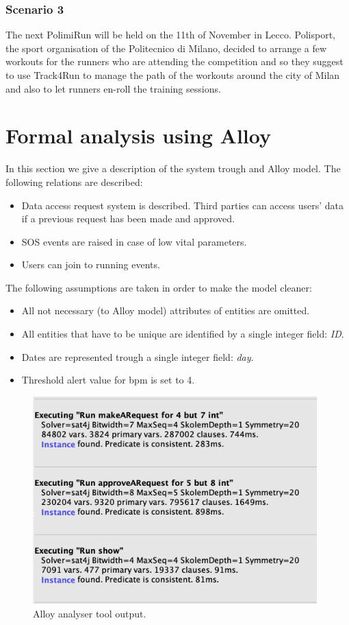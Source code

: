 \documentclass{article}
\begin{document}
	\subsubsection{Scenario 3}
	The next PolimiRun will be held on the 11th of November in Lecco.
	Polisport, the sport organisation of the Politecnico di Milano, 
	decided to arrange a few workouts for the runners who are 
	attending the competition and so they suggest to use Track4Run to
	manage the path of the workouts around the city of Milan and also
	to let runners en-roll the training sessions. 

\newpage
\section{Formal analysis using Alloy}

In this section we give a description of the system trough and Alloy model.
The following relations are described:
\begin{itemize}
	\item Data access request system is described. Third parties can access users' data
		if a previous request has been made and approved.
	\item SOS events are raised in case of low vital parameters.
	\item Users can join to running events.
\end{itemize}
The following assumptions are taken in order to make the model cleaner:
\begin{itemize}
	\item All not necessary (to Alloy model) attributes of entities are omitted.
	\item All entities that have to be unique are identified by a single integer field: \textit{ID}.
	\item Dates are represented trough a single integer field: \textit{day}.
	\item Threshold alert value for bpm is set to 4.
\end{itemize}
\newpage

\newpage

\begin{figure}[!h]
	\centering
	\includegraphics[height=8cm,keepaspectratio]{Figures/AlloyPredicates}
	\caption{Alloy analyser tool output.}
\end{figure}
\newpage
\end{document}
